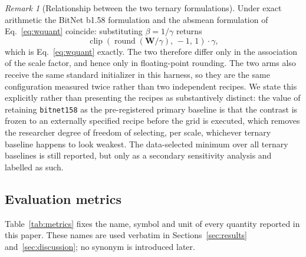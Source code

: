 \documentclass[final,5p,times,twocolumn]{elsarticle}
\theoremstyle{remark}
\newtheorem{remark}{Remark}
\newcommand{\Wm}{\mathbf{W}}
\newcommand{\clip}{\operatorname{clip}}
\newcommand{\round}{\operatorname{round}}
\begin{document}
\begin{remark}[Relationship between the two ternary formulations]
\label{rem:bitnet}
Under exact arithmetic the BitNet b1.58 formulation and the absmean formulation
of Eq.~\eqref{eq:wquant} coincide: substituting $\beta = 1/\gamma$ returns
\[
\clip\!\left(\round(\Wm/\gamma),\,-1,\,1\right)\cdot\gamma,
\]
which is Eq.~\eqref{eq:wquant} exactly. The two therefore differ only in the association
of the scale factor, and hence only in floating-point rounding. The two arms
also receive the same standard initializer in this harness, so they are the
same configuration measured twice rather than two independent recipes. We state this explicitly rather
than presenting the recipes as substantively distinct: the value of retaining
\texttt{bitnet158} as the pre-registered primary baseline is that the contrast
is frozen to an externally specified recipe before the grid is executed, which
removes the researcher degree of freedom of selecting, per scale, whichever
ternary baseline happens to look weakest. The data-selected minimum over all
ternary baselines is still reported, but only as a secondary sensitivity
analysis and labelled as such.
\end{remark}

\subsection{Evaluation metrics}
\label{sec:metrics}

Table~\ref{tab:metrics} fixes the name, symbol and unit of every quantity
reported in this paper. These names are used verbatim in
Sections~\ref{sec:results} and~\ref{sec:discussion}; no synonym is introduced
later.
\end{document}

